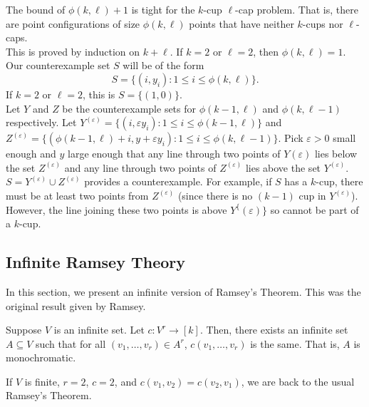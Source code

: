  	The bound of $\phi(k,\ell) + 1$ is tight for the $k$-cup $\ell$-cap problem. That is, there are point configurations of size $\phi(k,\ell)$ points that have neither $k$-cups nor $\ell$-caps.\\
 	This is proved by induction on $k+\ell$. If $k=2$ or $\ell=2$, then $\phi(k,\ell) = 1$. Our counterexample set $S$ will be of the form
 	\[ S = \{ (i,y_i) : 1 \le  i \le \phi(k,\ell) \}. \]
 	If $k=2$ or $\ell=2$, this is $S = \{ (1,0) \}$.\\
 	Let $Y$ and $Z$ be the counterexample sets for $\phi(k-1,\ell)$ and $\phi(k,\ell-1)$ respectively. Let $Y^{(\varepsilon)} = \{ (i,\varepsilon y_i) : 1 \le i \le \phi(k-1,\ell) \}$ and $Z^{(\varepsilon)} = \{ (\phi(k-1,\ell) + i,y + \varepsilon y_i) : 1 \le i \le \phi(k,\ell-1) \}$. Pick $\varepsilon > 0$ small enough and $y$ large enough that any line through two points of $Y{(\varepsilon)}$ lies below the set $Z^{(\varepsilon)}$ and any line through two points of $Z^{(\varepsilon)}$ lies above the set $Y^{(\varepsilon)}$.\\
 	$S = Y^{(\varepsilon)} \cup Z^{(\varepsilon)}$ provides a counterexample. For example, if $S$ has a $k$-cup, there must be at least two points from $Z^{(\varepsilon)}$ (since there is no $(k-1)$ cup in $Y^{(\varepsilon)}$). However, the line joining these two points is above $Y^\{(\varepsilon)\}$ so cannot be part of a $k$-cup.
		 
\subsection{Infinite Ramsey Theory}

	In this section, we present an infinite version of Ramsey's Theorem. This was the original result given by Ramsey.\\

	\begin{ftheo}
		Suppose $V$ is an infinite set. Let $c : V^{r} \to [k]$. Then, there exists an infinite set $A \subseteq V$ such that for all $(v_1,\ldots,v_r) \in A^{r}$, $c(v_1,\ldots,v_r)$ is the same. That is, $A$ is monochromatic.
	\end{ftheo}

	If $V$ is finite, $r=2$, $c=2$, and $c(v_1,v_2) = c(v_2,v_1)$, we are back to the usual Ramsey's Theorem.

